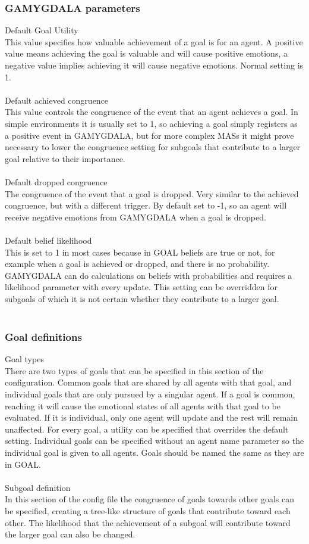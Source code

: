 \documentclass[11pt]{article}
\begin{document}
\subsubsection*{GAMYGDALA parameters}
Default Goal Utility\\
This value specifies how valuable achievement of a goal is for an agent. A positive value means achieving the goal is valuable and will cause positive emotions, a negative value implies achieving it will cause negative emotions. Normal setting is 1.\\
\\
Default achieved congruence\\
This value controls the congruence of the event that an agent achieves a goal. In simple environments it is usually set to 1, so achieving a goal simply registers as a positive event in GAMYGDALA, but for more complex MASs it might prove necessary to lower the congruence setting for subgoals that contribute to a larger goal relative to their importance.\\
\\
Default dropped congruence\\
The congruence of the event that a goal is dropped. Very similar to the achieved congruence, but with a different trigger. By default set to -1, so an agent will receive negative emotions from GAMYGDALA when a goal is dropped.\\
\\
Default belief likelihood\\
This is set to 1 in most cases because in GOAL beliefs are true or not, for example when a goal is achieved or dropped, and there is no probability. GAMYGDALA can do calculations on beliefs with probabilities and requires a likelihood parameter with every update. This setting can be overridden for subgoals of which it is not certain whether they contribute to a larger goal.\\
\\
\subsubsection*{Goal definitions}
Goal types\\
There are two types of goals that can be specified in this section of the configuration. Common goals that are shared by all agents with that goal, and individual goals that are only pursued by a singular agent. If a goal is common, reaching it will cause the emotional states of all agents with that goal to be evaluated. If it is individual, only one agent will update and the rest will remain unaffected. For every goal, a utility can be specified that overrides the default setting. Individual goals can be specified without an agent name parameter so the individual goal is given to all agents. Goals should be named the same as they are in GOAL.\\
\\
Subgoal definition\\
In this section of the config file the congruence of goals towards other goals can be specified, creating a tree-like structure of goals that contribute toward each other. The likelihood that the achievement of a subgoal will contribute toward the larger goal can also be changed.
\end{document}
